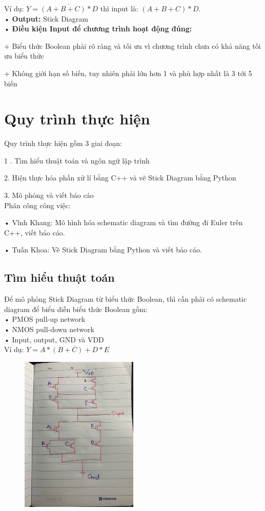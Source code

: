 \documentclass[a4paper,12pt]{article}
\begin{document}
Ví dụ: \( Y = \overline{(A + B + C) * D} \) thì input là: \( (A + B + C) * D \).\\
• \textbf{Output:} Stick Diagram\\
• \textbf{Điều kiện Input để chương trình hoạt động đúng:}

    + Biểu thức Boolean phải rõ ràng và tối ưu vì chương trình chưa có khả năng tối ưu biểu thức

    + Không giới hạn số biến, tuy nhiên phải lớn hơn 1 và phù hợp nhất là 3 tới 5 biến
\newpage
\section{Quy trình thực hiện}
Quy trình thực hiện gồm 3 giai đoạn:

1 . Tìm hiểu thuật toán và ngôn ngữ lập trình

2. Hiện thực hóa phần xử lí bằng C++ và vẽ Stick Diagram bằng Python

3. Mô phỏng và viết báo cáo\\
Phân công công việc:

• Vĩnh Khang: Mô hình hóa schematic diagram và tìm đường đi Euler trên C++, viết báo cáo.

• Tuấn Khoa: Vẽ Stick Diagram bằng Python và viết báo cáo.
\subsection{Tìm hiểu thuật toán}
Để mô phỏng Stick Diagram từ biểu thức Boolean, thì cần phải có schematic diagram để biểu diễn biểu thức Boolean gồm: \\
• PMOS pull-up network\\
• NMOS pull-down network\\
• Input, output, GND và VDD\\
Ví dụ: \( Y = \overline{A *(B + C) + D * E} \)\\
\begin{figure}[H]
    \centering
    \includegraphics[width=0.5\textwidth]{../PNG/ViDuSchematic.jpg}
    \label{fig:Ex_Schematic}\\
\end{figure}
\end{document}
